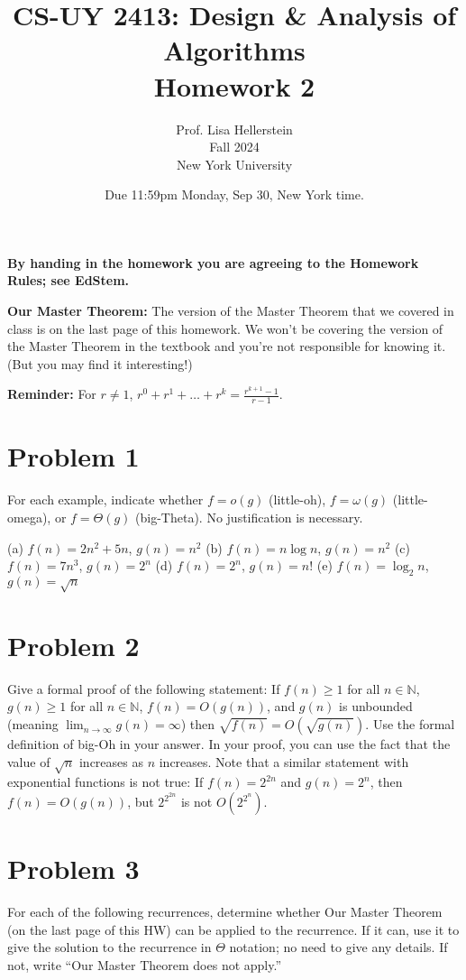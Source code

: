 \documentclass{article}
\begin{document}
\title{CS-UY 2413: Design \& Analysis of Algorithms \\ Homework 2}
\author{Prof. Lisa Hellerstein \\ Fall 2024 \\ New York University}
\date{Due 11:59pm Monday, Sep 30, New York time.}

\maketitle

\textbf{By handing in the homework you are agreeing to the Homework Rules; see EdStem.}

\textbf{Our Master Theorem:} The version of the Master Theorem that we covered in class is on the last page of this homework. We won’t be covering the version of the Master Theorem in the textbook and you’re not responsible for knowing it. (But you may find it interesting!)

\textbf{Reminder:} For $r \neq 1$, $r^0 + r^1 + \dots + r^k = \frac{r^{k+1} - 1}{r - 1}$.

\section*{Problem 1}
For each example, indicate whether $f = o(g)$ (little-oh), $f = \omega(g)$ (little-omega), or $f = \Theta(g)$ (big-Theta). No justification is necessary.

(a) $f(n) = 2n^2 + 5n$, $g(n) = n^2$
(b) $f(n) = n \log n$, $g(n) = n^2$
(c) $f(n) = 7n^3$, $g(n) = 2^n$
(d) $f(n) = 2^n$, $g(n) = n!$
(e) $f(n) = \log_2 n$, $g(n) = \sqrt{n}$

\section*{Problem 2}
Give a formal proof of the following statement: If $f(n) \ge 1$ for all $n \in \mathbb{N}$, $g(n) \ge 1$ for all $n \in \mathbb{N}$, $f(n) = O(g(n))$, and $g(n)$ is unbounded (meaning $\lim_{n \to \infty} g(n) = \infty$) then $\sqrt{f(n)} = O(\sqrt{g(n)})$.
Use the formal definition of big-Oh in your answer. In your proof, you can use the fact that the value of $\sqrt{n}$ increases as $n$ increases.
Note that a similar statement with exponential functions is not true: If $f(n) = 2^{2n}$ and $g(n) = 2^n$, then $f(n) = O(g(n))$, but $2^{2^{2n}}$ is not $O(2^{2^n})$.

\section*{Problem 3}
For each of the following recurrences, determine whether Our Master Theorem (on the last page of this HW) can be applied to the recurrence. If it can, use it to give the solution to the recurrence in $\Theta$ notation; no need to give any details. If not, write “Our Master Theorem does not apply.”
\end{document}
